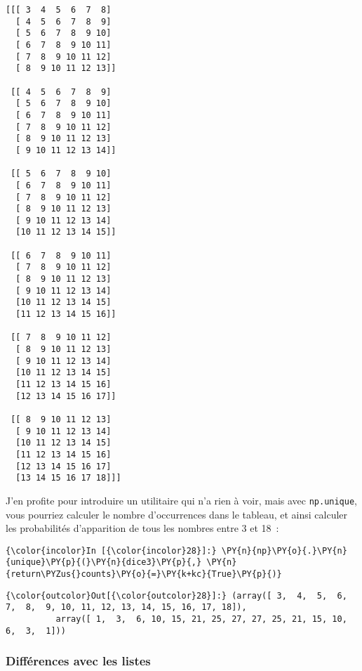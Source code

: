     \begin{Verbatim}[commandchars=\\\{\},frame=single,framerule=0.3mm,rulecolor=\color{cellframecolor}]
[[[ 3  4  5  6  7  8]
  [ 4  5  6  7  8  9]
  [ 5  6  7  8  9 10]
  [ 6  7  8  9 10 11]
  [ 7  8  9 10 11 12]
  [ 8  9 10 11 12 13]]

 [[ 4  5  6  7  8  9]
  [ 5  6  7  8  9 10]
  [ 6  7  8  9 10 11]
  [ 7  8  9 10 11 12]
  [ 8  9 10 11 12 13]
  [ 9 10 11 12 13 14]]

 [[ 5  6  7  8  9 10]
  [ 6  7  8  9 10 11]
  [ 7  8  9 10 11 12]
  [ 8  9 10 11 12 13]
  [ 9 10 11 12 13 14]
  [10 11 12 13 14 15]]

 [[ 6  7  8  9 10 11]
  [ 7  8  9 10 11 12]
  [ 8  9 10 11 12 13]
  [ 9 10 11 12 13 14]
  [10 11 12 13 14 15]
  [11 12 13 14 15 16]]

 [[ 7  8  9 10 11 12]
  [ 8  9 10 11 12 13]
  [ 9 10 11 12 13 14]
  [10 11 12 13 14 15]
  [11 12 13 14 15 16]
  [12 13 14 15 16 17]]

 [[ 8  9 10 11 12 13]
  [ 9 10 11 12 13 14]
  [10 11 12 13 14 15]
  [11 12 13 14 15 16]
  [12 13 14 15 16 17]
  [13 14 15 16 17 18]]]
\end{Verbatim}

    J'en profite pour introduire un utilitaire qui n'a rien à voir, mais
avec \texttt{np.unique}, vous pourriez calculer le nombre d'occurrences
dans le tableau, et ainsi calculer les probabilités d'apparition de tous
les nombres entre 3 et 18~:

    \begin{Verbatim}[commandchars=\\\{\},frame=single,framerule=0.3mm,rulecolor=\color{cellframecolor}]
{\color{incolor}In [{\color{incolor}28}]:} \PY{n}{np}\PY{o}{.}\PY{n}{unique}\PY{p}{(}\PY{n}{dice3}\PY{p}{,} \PY{n}{return\PYZus{}counts}\PY{o}{=}\PY{k+kc}{True}\PY{p}{)}
\end{Verbatim}


\begin{Verbatim}[commandchars=\\\{\},frame=single,framerule=0.3mm,rulecolor=\color{cellframecolor}]
{\color{outcolor}Out[{\color{outcolor}28}]:} (array([ 3,  4,  5,  6,  7,  8,  9, 10, 11, 12, 13, 14, 15, 16, 17, 18]),
          array([ 1,  3,  6, 10, 15, 21, 25, 27, 27, 25, 21, 15, 10,  6,  3,  1]))
\end{Verbatim}
            
    \hypertarget{diffuxe9rences-avec-les-listes}{%
\subsubsection{Différences avec les
listes}\label{diffuxe9rences-avec-les-listes}}

